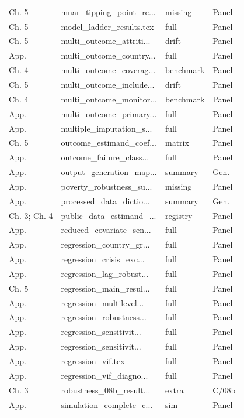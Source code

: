 \begin{longtable}{@{}p{}p{}p{}p{}@{}}
Ch. 5 & mnar\_tipping\_point\_re... & missing & Panel \\
Ch. 5 & model\_ladder\_results.tex & full & Panel \\
Ch. 5 & multi\_outcome\_attriti... & drift & Panel \\
App. & multi\_outcome\_country... & full & Panel \\
Ch. 4 & multi\_outcome\_coverag... & benchmark & Panel \\
Ch. 5 & multi\_outcome\_include... & drift & Panel \\
Ch. 4 & multi\_outcome\_monitor... & benchmark & Panel \\
App. & multi\_outcome\_primary... & full & Panel \\
App. & multiple\_imputation\_s... & full & Panel \\
Ch. 5 & outcome\_estimand\_coef... & matrix & Panel \\
App. & outcome\_failure\_class... & full & Panel \\
App. & output\_generation\_map... & summary & Gen. \\
App. & poverty\_robustness\_su... & missing & Panel \\
App. & processed\_data\_dictio... & summary & Gen. \\
Ch. 3; Ch. 4 & public\_data\_estimand\_... & registry & Panel \\
App. & reduced\_covariate\_sen... & full & Panel \\
App. & regression\_country\_gr... & full & Panel \\
App. & regression\_crisis\_exc... & full & Panel \\
App. & regression\_lag\_robust... & full & Panel \\
Ch. 5 & regression\_main\_resul... & full & Panel \\
App. & regression\_multilevel... & full & Panel \\
App. & regression\_robustness... & full & Panel \\
App. & regression\_sensitivit... & full & Panel \\
App. & regression\_sensitivit... & full & Panel \\
App. & regression\_vif.tex & full & Panel \\
App. & regression\_vif\_diagno... & full & Panel \\
Ch. 3 & robustness\_08b\_result... & extra & C/08b \\
App. & simulation\_complete\_c... & sim & Panel \\

\end{longtable}
